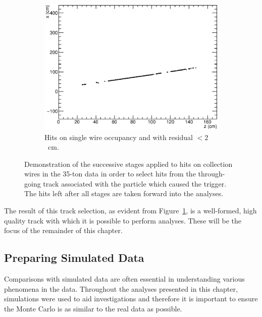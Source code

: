 \begin{figure}
\begin{subfigure}[t]{0.48\linewidth}
    \centering
    \includegraphics[width=\textwidth]{hitselection_final.eps}
    \caption{Hits on single wire occupancy and with residual $<2$~cm.}
    \label{fig:TrackSelectionFinal}
  \end{subfigure}
  \caption[Demonstration of the successive stages applied to hits on collection wires in the 35-ton data in order to select hits from the through-going track associated with the particle which caused the trigger.]{Demonstration of the successive stages applied to hits on collection wires in the 35-ton data in order to select hits from the through-going track associated with the particle which caused the trigger.  The hits left after all stages are taken forward into the analyses.}
  \label{fig:TrackSelection}
\end{figure}

The result of this track selection, as evident from Figure~\ref{fig:TrackSelectionFinal}, is a well-formed, high quality track with which it is possible to perform analyses.  These will be the focus of the remainder of this chapter.

\subsection{Preparing Simulated Data}\label{sec:SimulatedData}

Comparisons with simulated data are often essential in understanding various phenomena in the data.  Throughout the analyses presented in this chapter, simulations were used to aid investigations and therefore it is important to ensure the Monte Carlo is as similar to the real data as possible.

